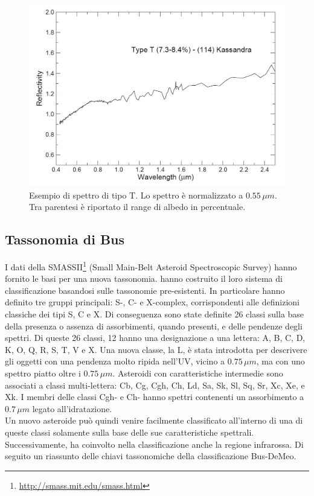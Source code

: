 \documentclass[a4paper,11pt,openright]{book}
\begin{document}
\begin{figure}[!h]
    \centering
    \includegraphics[scale=0.3]{figure/spettro_t.jpg}
    \caption[Esempio di spettro di tipo T.]{Esempio di spettro di tipo T. Lo spettro è normalizzato a $0.55\,\mu m$. Tra parentesi è riportato il range di albedo in percentuale. \citep{magrin_spectroscopic_nodate}}
    \label{spettro_t}
\end{figure}

\subsection{Tassonomia di Bus}
I dati della SMASSII\footnote{\href{http://smass.mit.edu/smass.html}{http://smass.mit.edu/smass.html}} (Small Main-Belt Asteroid Spectroscopic Survey) hanno fornito le basi per una nuova tassonomia. \citet{bus_phase_2002, bus_phase_2002-1} hanno costruito il loro sistema di classificazione basandosi sulle tassonomie pre-esistenti. In particolare hanno definito tre gruppi principali: S-, C- e X-complex, corrispondenti alle definizioni classiche dei tipi S, C e X. Di conseguenza sono state definite 26 classi sulla base della presenza o assenza di assorbimenti, quando presenti, e delle pendenze degli spettri. Di queste 26 classi, 12 hanno una designazione a una lettera: A, B, C, D, K, O, Q, R, S, T, V e X. Una nuova classe, la L, è stata introdotta per descrivere gli oggetti con una pendenza molto ripida nell'UV, vicino a $0.75\,\mu m$, ma con uno spettro piatto oltre i $0.75\,\mu m$. Asteroidi con caratteristiche intermedie sono associati a classi multi-lettera: Cb, Cg, Cgh, Ch, Ld, Sa, Sk, Sl, Sq, Sr, Xc, Xe, e Xk. I membri delle classi Cgh- e Ch- hanno spettri contenenti un assorbimento a $0.7\,\mu m$ legato all'idratazione.\\
Un nuovo asteroide può quindi venire facilmente classificato all’interno di una di queste classi solamente sulla base delle sue caratteristiche spettrali. Successivamente, \citet{demeo_extension_2009} ha coinvolto nella classificazione anche la regione infrarossa. Di seguito un riassunto delle chiavi tassonomiche della classificazione Bus-DeMeo.
\end{document}
